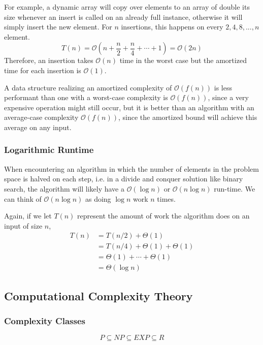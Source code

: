 \documentclass{article}
\newcommand{\bigO}{\mathcal{O}}
\begin{document}
    For example, a dynamic array will copy over elements to an array of double its size whenever an insert is called on an already full instance, otherwise it will simply insert the new element. For $n$ insertions, this happens on every $2, 4, 8, ..., n$ element.
    \[
        T(n) = \bigO ( n + \frac{n}{2} + \frac{n}{4} + \cdots + 1) 
        = \bigO(2n) 
    \]
    Therefore, an insertion takes $\bigO(n)$ time in the worst case but the amortized time for each insertion is $\bigO(1)$.
    
    A data structure realizing an amortized complexity of $\bigO (f(n))$ is less performant than one with a worst-case complexity is $\bigO(f(n))$, since a very expensive operation might still occur, but it is better than an algorithm with an average-case complexity $\bigO(f(n))$, since the amortized bound will achieve this average on any input.
    
    \subsubsection{Logarithmic Runtime}
    When encountering an algorithm in which the number of elements in the problem space is halved on each step, i.e. in a divide and conquer solution like binary search, the algorithm will likely have a $\bigO(\log n)$ or $\bigO(n \log n)$ run-time. We can think of $\bigO(n \log n)$ as doing $\log n$ work $n$ times. 
    
    Again, if we let $T(n)$ represent the amount of work the algorithm does on an input of size $n$,
    \begin{align*}
        T(n) &= T(n/2) + \Theta(1) \\
        &=  T(n/4)+ \Theta(1) + \Theta(1) \\ 
        &= \Theta(1) + \cdots + \Theta(1) \\
        &= \Theta(\log n ) 
    \end{align*}
    
    
    \subsection{Computational Complexity Theory}
    \subsubsection{Complexity Classes}
    \[
        P \subseteq NP \subseteq EXP \subseteq R
    \]
    
\end{document}
